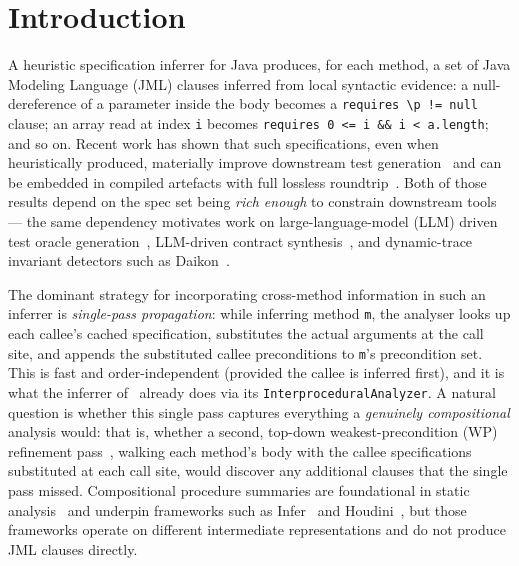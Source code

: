 \section{Introduction}
\label{sec:introduction}

A heuristic specification inferrer for Java produces, for each method,
a set of Java Modeling Language (JML) clauses inferred from local
syntactic evidence: a null-dereference of a parameter inside the body
becomes a \texttt{requires \textbackslash p != null} clause; an array
read at index \texttt{i} becomes \texttt{requires 0 <= i \&\& i < a.length};
and so on. Recent work has shown that such specifications, even when heuristically produced, materially improve downstream test generation~\cite{edmonds2026inference} and can be embedded in compiled artefacts with full lossless roundtrip~\cite{edmonds2026embedding}. Both of those results depend on the spec set being \emph{rich enough} to constrain downstream tools --- the same dependency motivates work on large-language-model (LLM) driven test oracle generation~\cite{schafer2023adaptive,lemieux2023codamosa,molinelli2025oracles,hossain2024togll}, LLM-driven contract synthesis~\cite{endres2024can,richter2025beyondpostconditions,ma2024specgen,konstantinou2024oracles}, and dynamic-trace invariant detectors such as Daikon~\cite{ernst2007daikon}.

The dominant strategy for incorporating cross-method information in such an inferrer is \emph{single-pass propagation}: while inferring method \texttt{m}, the analyser looks up each callee's cached specification, substitutes the actual arguments at the call site, and appends the substituted callee preconditions to \texttt{m}'s precondition set. This is fast and order-independent (provided the callee is inferred first), and it is what the inferrer of~\cite{edmonds2026inference} already does via its \texttt{InterproceduralAnalyzer}. A natural question is whether this single pass captures everything a \emph{genuinely compositional} analysis would: that is, whether a second, top-down weakest-precondition (WP) refinement pass~\cite{dijkstra_guarded_1975,dijkstra1976discipline,hoare1969axiomatic}, walking each method's body with the callee specifications substituted at each call site, would discover any additional clauses that the single pass missed. Compositional procedure summaries are foundational in static analysis~\cite{cousot1977abstract,cousot2011contract} and underpin frameworks such as Infer~\cite{calcagno2015infer} and Houdini~\cite{flanagan2001houdini}, but those frameworks operate on different intermediate representations and do not produce JML clauses directly.

